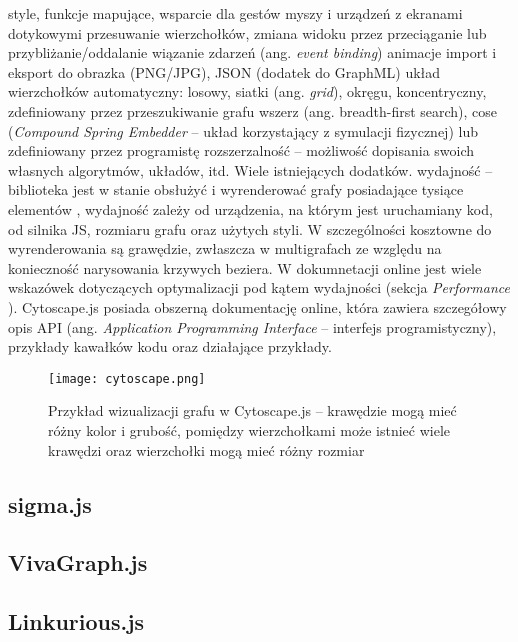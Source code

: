 style, funkcje mapujące, 
wsparcie dla gestów myszy i urządzeń z ekranami dotykowymi
przesuwanie wierzchołków, zmiana widoku przez przeciąganie lub przybliżanie/oddalanie
wiązanie zdarzeń (ang. \textit{event binding})  
animacje
import i eksport do obrazka (PNG/JPG), JSON (dodatek do GraphML)
układ wierzchołków automatyczny: losowy, siatki (ang. \textit{grid}), okręgu, koncentryczny, zdefiniowany przez przeszukiwanie grafu wszerz (ang. breadth-first search), cose (\textit{Compound Spring Embedder} -- układ korzystający z symulacji fizycznej) lub zdefiniowany przez programistę
rozszerzalność -- możliwość dopisania swoich własnych algorytmów, układów, itd. Wiele istniejących dodatków. 
wydajność -- biblioteka jest w stanie obsłużyć i wyrenderować grafy posiadające tysiące elementów \cite[310]{franz}, wydajność zależy od urządzenia, na którym jest uruchamiany kod, od silnika JS, rozmiaru grafu oraz użytych styli. W szczególności kosztowne do wyrenderowania są grawędzie, zwłaszcza w multigrafach ze względu na konieczność narysowania krzywych beziera. W dokumnetacji online jest wiele wskazówek dotyczących optymalizacji pod kątem wydajności (sekcja \textit{Performance} \cite{cytoscape}).
Cytoscape.js posiada obszerną dokumentację online, która zawiera szczegółowy opis API (ang. \textit{Application Programming Interface} -- interfejs programistyczny), przykłady kawałków kodu oraz działające przykłady. 


\begin{figure}[H]
\centering
\texttt{[image: cytoscape.png]}
\caption{Przykład wizualizacji grafu w Cytoscape.js -- krawędzie mogą mieć różny kolor i grubość, pomiędzy wierzchołkami może istnieć wiele krawędzi oraz wierzchołki mogą mieć różny rozmiar}\label{fig:cytoscape}
\end{figure}

\subsection{sigma.js}
\subsection{VivaGraph.js}
\subsection{Linkurious.js}

